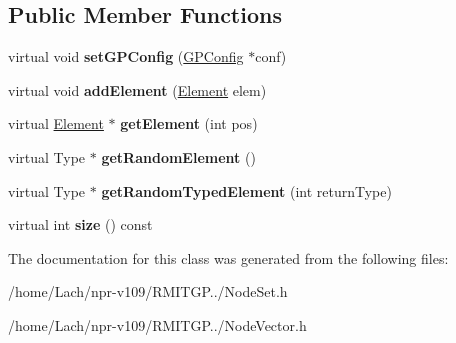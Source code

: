 \subsection*{Public Member Functions}
\begin{DoxyCompactItemize}
\item 
\hypertarget{classNodeVector_a38cd6775097581eb3fa51904505551ca}{}\label{classNodeVector_a38cd6775097581eb3fa51904505551ca} 
virtual void {\bfseries set\+G\+P\+Config} (\hyperlink{classGPConfig}{G\+P\+Config} $\ast$conf)
\item 
\hypertarget{classNodeVector_a35b8d230582dc5f2fca7005ed1f56277}{}\label{classNodeVector_a35b8d230582dc5f2fca7005ed1f56277} 
virtual void {\bfseries add\+Element} (\hyperlink{classNodeVector_1_1Element}{Element} elem)
\item 
\hypertarget{classNodeVector_a5bfc55e64d49c06d1ecad86d0f5cd5fb}{}\label{classNodeVector_a5bfc55e64d49c06d1ecad86d0f5cd5fb} 
virtual \hyperlink{classNodeVector_1_1Element}{Element} $\ast$ {\bfseries get\+Element} (int pos)
\item 
\hypertarget{classNodeVector_aa9d5b553e48aed8fd27404a646622a93}{}\label{classNodeVector_aa9d5b553e48aed8fd27404a646622a93} 
virtual Type $\ast$ {\bfseries get\+Random\+Element} ()
\item 
\hypertarget{classNodeVector_a6654cfbddb5867db262f388447ea7596}{}\label{classNodeVector_a6654cfbddb5867db262f388447ea7596} 
virtual Type $\ast$ {\bfseries get\+Random\+Typed\+Element} (int return\+Type)
\item 
\hypertarget{classNodeVector_a216c2a874bacd4f5c351ee4875c13a32}{}\label{classNodeVector_a216c2a874bacd4f5c351ee4875c13a32} 
virtual int {\bfseries size} () const
\end{DoxyCompactItemize}


The documentation for this class was generated from the following files\+:\begin{DoxyCompactItemize}
\item 
/home/\+Lach/npr-\/v109/\+R\+M\+I\+T\+G\+P../Node\+Set.\+h\item 
/home/\+Lach/npr-\/v109/\+R\+M\+I\+T\+G\+P../Node\+Vector.\+h\end{DoxyCompactItemize}

